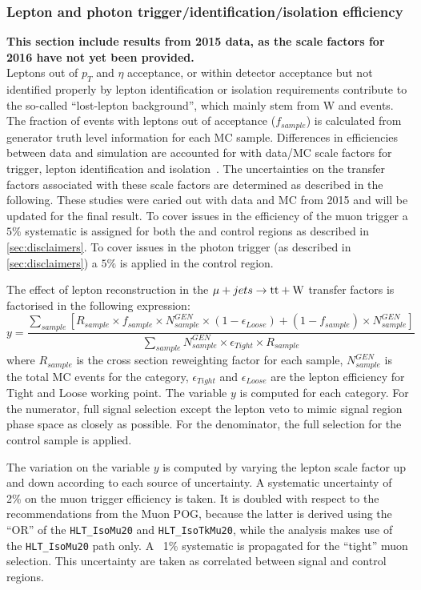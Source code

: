\subsubsection*{Lepton and photon trigger/identification/isolation efficiency}
\label{sec:tfSyst_lepton}
\textbf{This section include results from 2015 data, as the scale factors for 2016 have not yet been provided.}\\
Leptons out of $p_{T}$ and $\eta$ acceptance, or within detector
acceptance but not identified properly by lepton identification or isolation
requirements contribute to the so-called ``lost-lepton background'', 
which mainly stem from W and \ttbar events. 
The fraction of events with leptons out of acceptance ($f_{sample}$)
is calculated from generator truth level information for each MC
sample. Differences in efficiencies between data and simulation are
accounted for with data/MC scale
factors for trigger, lepton identification and isolation~\cite{twiki-leptonSF}. 
The uncertainties on the transfer factors associated 
with these scale factors are determined as described in the following.
These studies were caried out with data and MC from 2015 and will be updated 
for the final result. To cover issues in the efficiency of the
muon trigger a $5\%$ systematic is assigned for both the \mj and \mmj 
control regions as described in \ref{sec:disclaimers}. To cover 
issues in the photon trigger (as described in \ref{sec:disclaimers}) a $5\%$ is applied in the
\gj control region.

The effect of lepton reconstruction in the $\mu + jets \rightarrow \mathrm{tt+W}$ 
transfer factors is factorised in the following expression: 
\begin{equation}
    \label{eq:lostLepTF}
    y = \frac{\sum_{sample} [ R_{sample} \times f_{sample} \times N^{GEN}_{sample} \times ( 1 - \epsilon_{Loose} ) + ( 1 - f_{sample} ) \times N^{GEN}_{sample} ]}{ \sum_{sample} N^{GEN}_{sample} \times \epsilon_{Tight} \times R_{sample} }
\end{equation}
where $R_{sample}$ is the cross section reweighting factor for each sample, 
$N^{GEN}_{sample}$ is the total MC events for the category, $\epsilon_{Tight}$
and $\epsilon_{Loose}$ are the lepton efficiency for Tight and Loose working 
point. The variable $y$ is computed for each category. For the numerator, full
signal selection except the lepton veto to mimic signal region phase space as
closely as possible. For the denominator, the full selection for the \mj 
control sample is applied.

The variation on the variable $y$ is computed by varying the lepton scale factor
up and down according to each source of uncertainty. 
A systematic uncertainty of 2\% on the muon trigger efficiency is taken. 
It is doubled with respect to the recommendations from the Muon POG, because the latter is derived using the 
``OR'' of the \verb!HLT_IsoMu20! and \verb!HLT_IsoTkMu20!, while the analysis makes use of the \verb!HLT_IsoMu20! path only. 
A ~1\% systematic is propagated for the ``tight'' muon selection. 
This uncertainty are taken as correlated between signal and control regions. 

